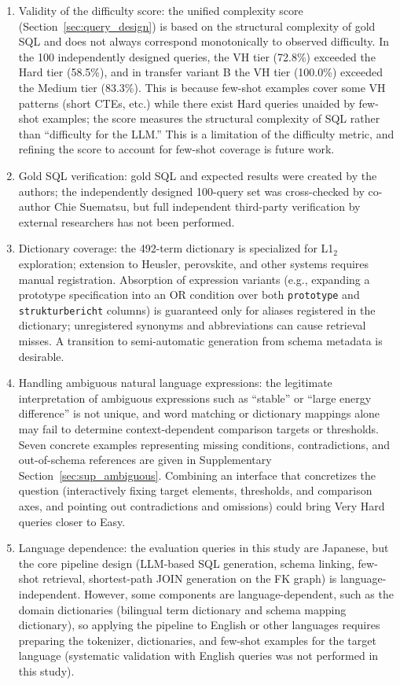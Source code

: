 \begin{enumerate}
  \item Validity of the difficulty score:
    the unified complexity score (Section~\ref{sec:query_design}) is based on the structural complexity of gold SQL and does not always correspond monotonically to observed difficulty. In the 100 independently designed queries, the VH tier (72.8\%) exceeded the Hard tier (58.5\%), and in transfer variant B the VH tier (100.0\%) exceeded the Medium tier (83.3\%). This is because few-shot examples cover some VH patterns (short CTEs, etc.) while there exist Hard queries unaided by few-shot examples; the score measures the structural complexity of SQL rather than ``difficulty for the LLM.'' This is a limitation of the difficulty metric, and refining the score to account for few-shot coverage is future work.
  \item Gold SQL verification:
    gold SQL and expected results were created by the authors; the independently designed 100-query set was cross-checked by co-author Chie Suematsu, but full independent third-party verification by external researchers has not been performed.
  \item Dictionary coverage:
    the 492-term dictionary is specialized for L1$_2$ exploration; extension to Heusler, perovskite, and other systems requires manual registration. Absorption of expression variants (e.g., expanding a prototype specification into an OR condition over both \texttt{prototype} and \texttt{strukturbericht} columns) is guaranteed only for aliases registered in the dictionary; unregistered synonyms and abbreviations can cause retrieval misses. A transition to semi-automatic generation from schema metadata is desirable.
  \item Handling ambiguous natural language expressions:
    the legitimate interpretation of ambiguous expressions such as ``stable'' or ``large energy difference'' is not unique, and word matching or dictionary mappings alone may fail to determine context-dependent comparison targets or thresholds. Seven concrete examples representing missing conditions, contradictions, and out-of-schema references are given in Supplementary Section~\ref{sec:sup_ambiguous}. Combining an interface that concretizes the question (interactively fixing target elements, thresholds, and comparison axes, and pointing out contradictions and omissions) could bring Very Hard queries closer to Easy.
  \item Language dependence:
    the evaluation queries in this study are Japanese, but the core pipeline design (LLM-based SQL generation, schema linking, few-shot retrieval, shortest-path JOIN generation on the FK graph) is language-independent. However, some components are language-dependent, such as the domain dictionaries (bilingual term dictionary and schema mapping dictionary), so applying the pipeline to English or other languages requires preparing the tokenizer, dictionaries, and few-shot examples for the target language (systematic validation with English queries was not performed in this study).

\end{enumerate}
